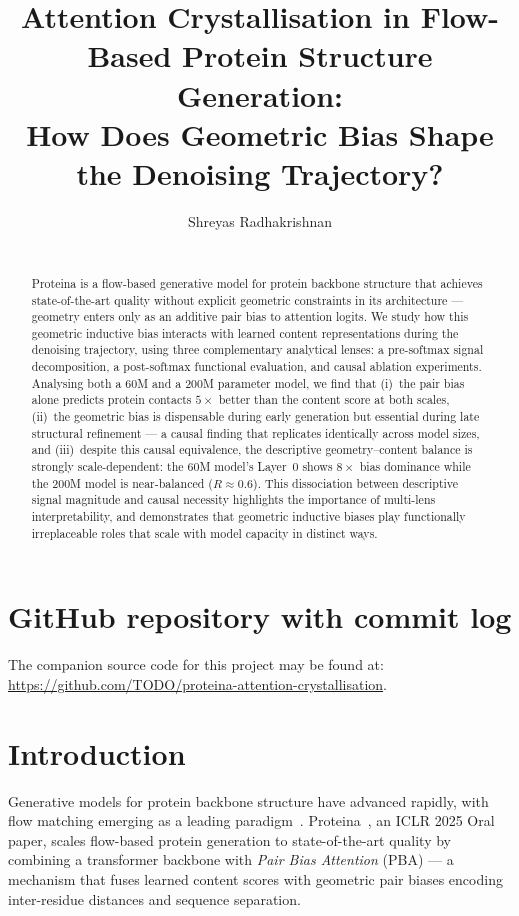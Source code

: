 \documentclass{article}
\title[Attention Crystallisation in Flow-Based Protein Structure Generation]{Attention Crystallisation in Flow-Based Protein Structure Generation:\\
How Does Geometric Bias Shape the Denoising Trajectory?}
\author[S. Radhakrishnan]{Shreyas Radhakrishnan\\
\institute{University of Cambridge}\\
\email{sr2173@cam.ac.uk}}
\begin{document}
\maketitle

\section*{GitHub repository with commit log}
The companion source code for this project may be found at: \url{https://github.com/TODO/proteina-attention-crystallisation}.

\begin{abstract}
Proteina is a flow-based generative model for protein backbone structure that achieves state-of-the-art quality without explicit geometric constraints in its architecture --- geometry enters only as an additive pair bias to attention logits.
We study how this geometric inductive bias interacts with learned content representations during the denoising trajectory, using three complementary analytical lenses: a pre-softmax signal decomposition, a post-softmax functional evaluation, and causal ablation experiments.
Analysing both a 60M and a 200M parameter model, we find that (i)~the pair bias alone predicts protein contacts $5\times$ better than the content score at both scales, (ii)~the geometric bias is dispensable during early generation but essential during late structural refinement --- a causal finding that replicates identically across model sizes, and (iii)~despite this causal equivalence, the descriptive geometry--content balance is strongly scale-dependent: the 60M model's Layer~0 shows $8\times$ bias dominance while the 200M model is near-balanced ($R \approx 0.6$).
This dissociation between descriptive signal magnitude and causal necessity highlights the importance of multi-lens interpretability, and demonstrates that geometric inductive biases play functionally irreplaceable roles that scale with model capacity in distinct ways.
\end{abstract}

\section{Introduction}

Generative models for protein backbone structure have advanced rapidly, with flow matching emerging as a leading paradigm~\citep{lipman2023flow}.
Proteina~\citep{geffner2025proteina}, an ICLR 2025 Oral paper, scales flow-based protein generation to state-of-the-art quality by combining a transformer backbone with \emph{Pair Bias Attention} (PBA) --- a mechanism that fuses learned content scores with geometric pair biases encoding inter-residue distances and sequence separation.
\end{document}
